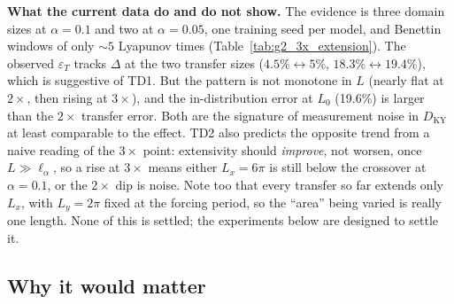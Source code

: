 \documentclass[11pt]{article}
\begin{document}
\textbf{What the current data do and do not show.} The evidence is
three domain sizes at $\alpha=0.1$ and two at $\alpha=0.05$, one
training seed per model, and Benettin windows of only $\sim5$ Lyapunov
times (Table~\ref{tab:g2_3x_extension}). The observed $\varepsilon_T$
tracks $\Delta$ at the two transfer sizes ($4.5\%\leftrightarrow5\%$,
$18.3\%\leftrightarrow19.4\%$), which is suggestive of TD1. But the
pattern is not monotone in $L$ (nearly flat at $2\times$, then rising
at $3\times$), and the in-distribution error at $L_0$ (19.6\%) is larger
than the $2\times$ transfer error. Both are the signature of measurement
noise in $D_{\mathrm{KY}}$ at least comparable to the effect. TD2 also
predicts the opposite trend from a naive reading of the $3\times$ point:
extensivity should \emph{improve}, not worsen, once $L\gg\ell_\alpha$,
so a rise at $3\times$ means either $L_x=6\pi$ is still below the
crossover at $\alpha=0.1$, or the $2\times$ dip is noise. Note too that
every transfer so far extends only $L_x$, with $L_y=2\pi$ fixed at the
forcing period, so the ``area'' being varied is really one length. None
of this is settled; the experiments below are designed to settle it.

\subsection{Why it would matter}
\end{document}
